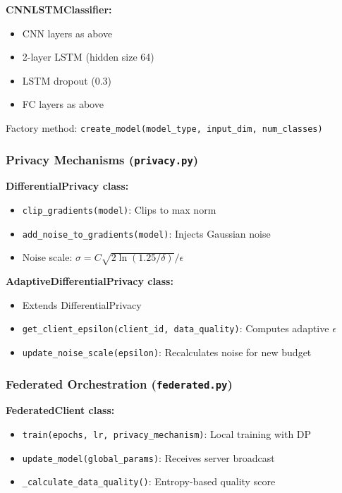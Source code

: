 \textbf{CNNLSTMClassifier:}
\begin{itemize}
    \item CNN layers as above
    \item 2-layer LSTM (hidden size 64)
    \item LSTM dropout (0.3)
    \item FC layers as above
\end{itemize}

Factory method: \texttt{create\_model(model\_type, input\_dim, num\_classes)}

\subsubsection{Privacy Mechanisms (\texttt{privacy.py})}

\textbf{DifferentialPrivacy class:}
\begin{itemize}
    \item \texttt{clip\_gradients(model)}: Clips to max norm
    \item \texttt{add\_noise\_to\_gradients(model)}: Injects Gaussian noise
    \item Noise scale: $\sigma = C\sqrt{2\ln(1.25/\delta)} / \epsilon$
\end{itemize}

\textbf{AdaptiveDifferentialPrivacy class:}
\begin{itemize}
    \item Extends DifferentialPrivacy
    \item \texttt{get\_client\_epsilon(client\_id, data\_quality)}: Computes adaptive $\epsilon$
    \item \texttt{update\_noise\_scale(epsilon)}: Recalculates noise for new budget
\end{itemize}

\subsubsection{Federated Orchestration (\texttt{federated.py})}

\textbf{FederatedClient class:}
\begin{itemize}
    \item \texttt{train(epochs, lr, privacy\_mechanism)}: Local training with DP
    \item \texttt{update\_model(global\_params)}: Receives server broadcast
    \item \texttt{\_calculate\_data\_quality()}: Entropy-based quality score
\end{itemize}

